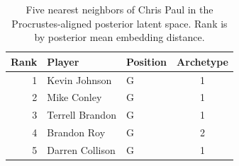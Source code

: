 \begin{table}[htbp]
  \centering\small
  \begin{tabular}{rllc}
    \toprule
    Rank & Player & Position & Archetype \\
    \midrule
    1 & Kevin Johnson & G & 1 \\
    2 & Mike Conley & G & 1 \\
    3 & Terrell Brandon & G & 1 \\
    4 & Brandon Roy & G & 2 \\
    5 & Darren Collison & G & 1 \\
    \bottomrule
  \end{tabular}
  \caption{Five nearest neighbors of Chris Paul in the Procrustes-aligned posterior latent space. Rank is by posterior mean embedding distance.}
  \label{tab:Chris_Paul_neighbors}
\end{table}

